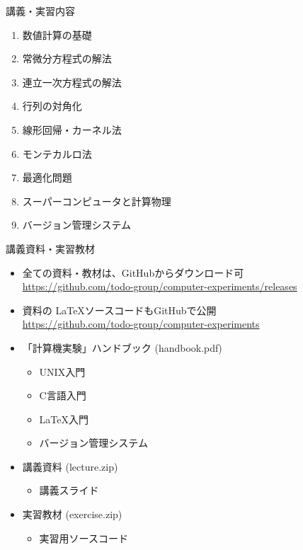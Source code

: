 \documentclass[dvipdfmx]{beamer}
\begin{document}
\begin{frame}[t]{講義・実習内容}
  \begin{enumerate}
  \item 数値計算の基礎
  \item 常微分方程式の解法
  \item 連立一次方程式の解法
  \item 行列の対角化
  \item 線形回帰・カーネル法
  \item モンテカルロ法
  \item 最適化問題
  \item スーパーコンピュータと計算物理
  \item バージョン管理システム
  \end{enumerate}
\end{frame}

\begin{frame}[t]{講義資料・実習教材}
  \begin{itemize}
  \item 全ての資料・教材は、GitHubからダウンロード可 \\
    {\footnotesize \url{https://github.com/todo-group/computer-experiments/releases}}
  \item 資料の \LaTeX ソースコードもGitHubで公開 \\
    {\footnotesize \url{https://github.com/todo-group/computer-experiments}}
  \item 「計算機実験」ハンドブック (handbook.pdf)
    \begin{itemize}
    \item UNIX入門
    \item C言語入門
    \item \LaTeX 入門
    \item バージョン管理システム
    \end{itemize}
  \item 講義資料 (lecture.zip)
    \begin{itemize}
    \item 講義スライド 
    \end{itemize}
  \item 実習教材 (exercise.zip)
    \begin{itemize}
    \item 実習用ソースコード
    \end{itemize}
  \end{itemize}
\end{frame}
\end{document}
